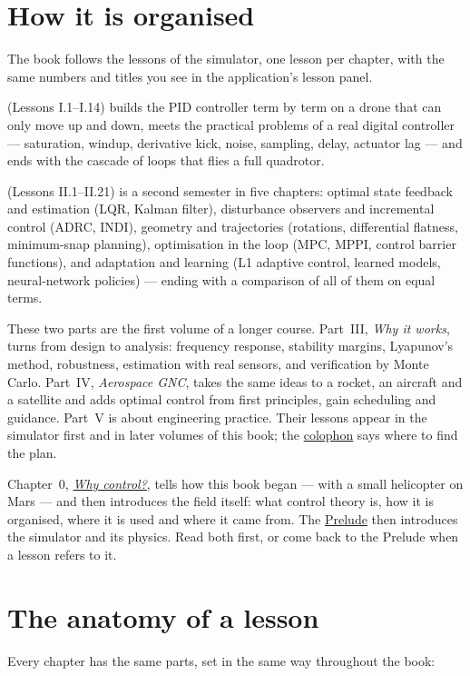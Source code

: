 \section*{How it is organised}
The book follows the lessons of the simulator, one lesson per chapter, with the same numbers and titles you see in the application's lesson panel.
\begin{description}[leftmargin=0pt, font=\sffamily\small\bfseries]
  \item[Part I · PID] (Lessons I.1–I.14) builds the PID controller term by term on a drone that can only move up and down, meets the practical problems of a real digital controller — saturation, windup, derivative kick, noise, sampling, delay, actuator lag — and ends with the cascade of loops that flies a full quadrotor.
  \item[Part II · Beyond PID] (Lessons II.1–II.21) is a second semester in five chapters: optimal state feedback and estimation (LQR, Kalman filter), disturbance observers and incremental control (ADRC, INDI), geometry and trajectories (rotations, differential flatness, minimum-snap planning), optimisation in the loop (MPC, MPPI, control barrier functions), and adaptation and learning (L1 adaptive control, learned models, neural-network policies) — ending with a comparison of all of them on equal terms.
\end{description}
These two parts are the first volume of a longer course. Part~III, \emph{Why it works}, turns from design to analysis: frequency response, stability margins, Lyapunov's method, robustness, estimation with real sensors, and verification by Monte Carlo. Part~IV, \emph{Aerospace GNC}, takes the same ideas to a rocket, an aircraft and a satellite and adds optimal control from first principles, gain scheduling and guidance. Part~V is about engineering practice. Their lessons appear in the simulator first and in later volumes of this book; the \hyperref[ch:colophon]{colophon} says where to find the plan.

Chapter~0, \hyperref[ch:intro]{\emph{Why control?}}, tells how this book began — with a small helicopter on Mars — and then introduces the field itself: what control theory is, how it is organised, where it is used and where it came from. The \hyperref[ch:prelude]{Prelude} then introduces the simulator and its physics. Read both first, or come back to the Prelude when a lesson refers to it.

\section*{The anatomy of a lesson}
Every chapter has the same parts, set in the same way throughout the book:


